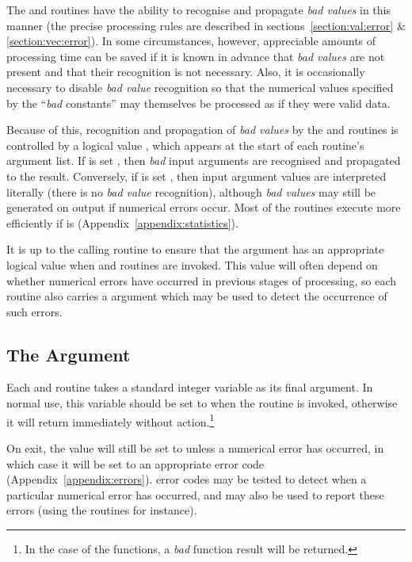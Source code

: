 The  and  routines have the ability to recognise
and propagate {\em bad values} in this manner (the precise processing rules 
are described in sections~\ref{section:val:error} \& \ref{section:vec:error}).
In some circumstances, however, appreciable amounts of processing time can
be saved if it is known in advance that {\em bad values} are not present and
that their recognition is not necessary. 
Also, it is occasionally necessary to disable {\em bad value} recognition so
that the numerical values specified by the ``{\em bad} constants'' may
themselves be processed as if they were valid data. 

Because of this, recognition and propagation of {\em bad values} by the
 and  routines is controlled by a logical value
, which appears at the start of each routine's argument list. 
If  is set , then {\em bad} input arguments are
recognised and propagated to the result. 
Conversely, if  is set , then input argument
values are interpreted literally (there is no {\em bad value} recognition),
although {\em bad values} may still be generated on output if numerical
errors occur. 
Most of the routines execute more efficiently if  is 
 (Appendix~\ref{appendix:statistics}).

It is up to the calling routine to ensure that the  argument
has an appropriate logical value when  and  routines
are invoked. 
This value will often depend on whether numerical errors have occurred in
previous stages of processing, so each routine also carries a
 argument which may be used to detect the occurrence of such
errors. 

\subsection{The  Argument}

Each  and  routine takes a standard 
integer  variable as its final argument.
In normal use, this  variable should be set to
 when the routine is invoked, otherwise it will return
immediately without action.\footnote{
In the case of the  functions, a {\em bad} function result will
be returned.} 

On exit, the  value will still be set to 
unless a numerical error has occurred, in which case it will be set to an
appropriate error code (Appendix~\ref{appendix:errors}). 
 error codes may be tested to detect when a particular
numerical error has occurred, and may also be used to report these errors
(using the   routines for instance). 

